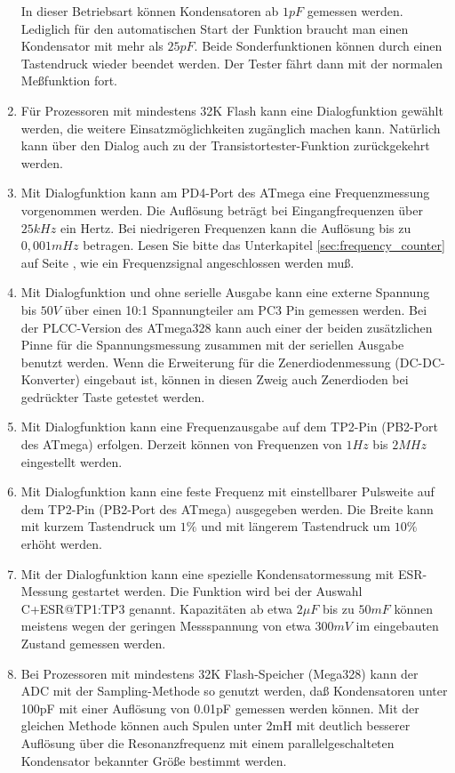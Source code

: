 \begin{enumerate}
In dieser Betriebsart können Kondensatoren ab \(1pF\) gemessen werden. Lediglich für den automatischen Start der Funktion
braucht man einen Kondensator mit mehr als \(25pF\).
Beide Sonderfunktionen können durch einen Tastendruck wieder beendet werden. Der Tester fährt dann mit der normalen
Meßfunktion fort.
\item Für Prozessoren mit mindestens 32K Flash kann eine Dialogfunktion gewählt werden, 
die weitere Einsatzmöglichkeiten zugänglich machen kann.
Natürlich kann über den Dialog auch zu der Transistortester-Funktion zurückgekehrt werden.
\item Mit Dialogfunktion kann am PD4-Port des ATmega eine Frequenzmessung vorgenommen werden.
Die Auflösung beträgt bei Eingangfrequenzen über \(25kHz\) ein Hertz.
Bei niedrigeren Frequenzen kann die Auflösung bis zu \(0,001mHz\) betragen.
Lesen Sie bitte das Unterkapitel \ref{sec:frequency_counter} auf Seite \pageref{sec:frequency_counter},
wie ein Frequenzsignal angeschlossen werden muß.
\item Mit Dialogfunktion und ohne serielle Ausgabe kann eine externe Spannung bis \(50V\) über einen
10:1 Spannungteiler am PC3 Pin gemessen werden. Bei der PLCC-Version des ATmega328 kann auch einer der beiden
zusätzlichen Pinne für die Spannungsmessung zusammen mit der seriellen Ausgabe benutzt werden.
Wenn die Erweiterung für die Zenerdiodenmessung (DC-DC-Konverter)
eingebaut ist, können in diesen Zweig auch Zenerdioden bei gedrückter Taste getestet werden.
\item Mit Dialogfunktion kann eine Frequenzausgabe auf dem TP2-Pin (PB2-Port des ATmega) erfolgen.
Derzeit können von Frequenzen von \(1Hz\) bis \(2MHz\) eingestellt werden.
\item Mit Dialogfunktion kann eine feste Frequenz mit einstellbarer Pulsweite auf dem TP2-Pin (PB2-Port des ATmega)
ausgegeben werden.
Die Breite kann mit kurzem Tastendruck um \(1\%\) und mit längerem Tastendruck um \(10\%\) erhöht werden.
\item Mit der Dialogfunktion kann eine spezielle Kondensatormessung mit ESR-Messung gestartet werden.
Die Funktion wird bei der Auswahl \mbox{C+ESR@TP1:TP3} genannt.
 Kapazitäten ab etwa \(2\mu F\) bis zu \(50mF\) können meistens wegen der geringen Messspannung von etwa \(300mV\)
 im eingebauten Zustand gemessen werden.
\item Bei Prozessoren mit mindestens 32K Flash-Speicher (Mega328) kann der ADC mit der Sampling-Methode so genutzt werden,
daß Kondensatoren unter 100pF mit einer Auflösung von 0.01pF gemessen werden können. Mit der gleichen Methode können
auch Spulen unter 2mH mit deutlich besserer Auflösung über die Resonanzfrequenz mit einem parallelgeschalteten Kondensator 
bekannter Größe bestimmt werden.

\end{enumerate}

